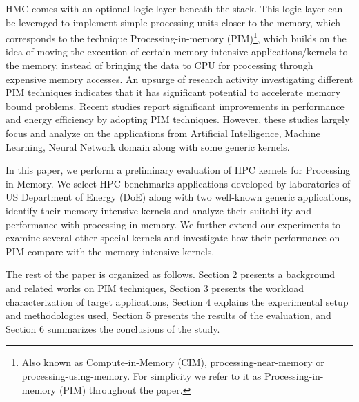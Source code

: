 HMC comes with an optional logic layer beneath the stack. This logic layer can be leveraged to implement simple processing units closer to the memory, which corresponds to the technique Processing-in-memory (PIM)\footnote{Also known as Compute-in-Memory (CIM), processing-near-memory or processing-using-memory. For simplicity we refer to it as Processing-in-memory (PIM) throughout the paper.}, which builds on the idea of moving the execution of certain memory-intensive applications/kernels to the memory, instead of bringing the data to CPU for processing through expensive memory accesses. An upsurge of research activity investigating different PIM techniques indicates that it has significant potential to accelerate memory bound problems. Recent studies report significant improvements in performance and energy efficiency by adopting PIM techniques. However, these studies largely focus and analyze on the applications from Artificial Intelligence, Machine Learning, Neural Network domain along with some generic kernels. 

In this paper, we perform a preliminary evaluation of HPC kernels for Processing in Memory. We select  HPC benchmarks applications developed by laboratories of US Department of Energy (DoE) along with two well-known generic applications, identify their memory intensive kernels and analyze their suitability and performance with processing-in-memory. We further extend our experiments to examine several other special kernels and investigate how their performance on PIM compare with the memory-intensive kernels.   

The rest of the paper is organized as follows. Section 2 presents a background and related works on PIM techniques, Section 3 presents the workload characterization of target applications, Section 4 explains the experimental setup and methodologies used, Section 5 presents the results of the evaluation, and Section 6 summarizes the conclusions of the study.   
